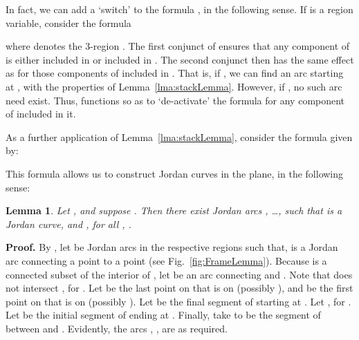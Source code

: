 \documentclass{article}
\newtheorem{lemma}[theorem]{Lemma}
\newcommand{\qedsymbol}{\ding{113}}
\newenvironment{proof}{\par\noindent\textbf{Proof.}}{\mbox{}\hfill\qedsymbol\par\bigskip}
\begin{document}
In fact, we can add a `switch'  to the formula , in the following sense.  If  is a region
variable, consider the formula 

where  denotes the 3-region . The first conjunct of
 ensures that any component
of  is either included in  or included in
. The second conjunct then has the same effect as
 for those components of
 included in . That is, if , we can find an arc  starting at , with the properties of
Lemma~\ref{lma:stackLemma}.  However, if , no such arc need exist.  Thus,  functions so as to
`de-activate' the formula 
for any component of  included in it.

As a further application of Lemma~\ref{lma:stackLemma}, consider the
formula  given by:

This formula allows us to construct Jordan curves in the plane, in
the following sense:
\begin{lemma}
\label{lma:FrameLemma}
Let , and suppose .  Then there exist Jordan arcs , \ldots,
 such that  is a Jordan
curve, and , for all , .
\end{lemma}
\begin{proof}
By , let
 be Jordan arcs in the respective
regions  such that, 
 is a Jordan arc connecting 
a point  to a 
point  (see 
Fig.~\ref{fig:FrameLemma}). Because  is a 
connected subset of the interior of , let  
be an arc connecting  and . Note that  does not intersect 
, for . Let  be the last point on  that 
is on  (possibly ), and  be the first point on  
that is on  (possibly ). Let  be the final segment of 
 starting at . Let , for .
Let  be the initial segment of  ending at .
Finally, take  to be the segment of  between  and .
Evidently, the arcs , , are as required.
\end{proof}
\end{document}
